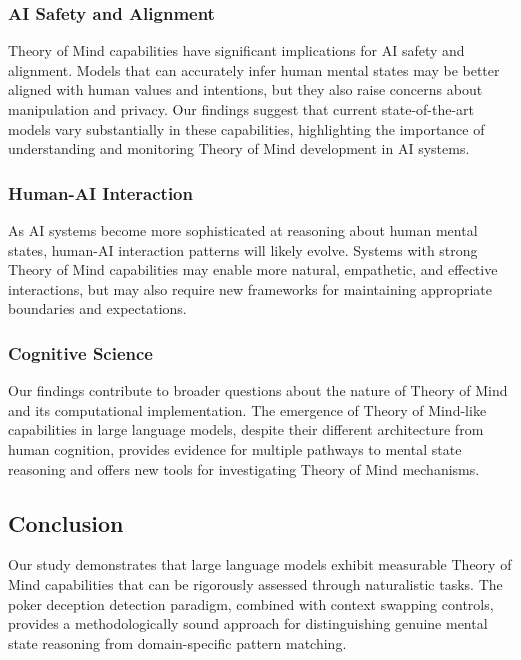 \subsubsection{AI Safety and Alignment}

Theory of Mind capabilities have significant implications for AI safety and alignment. Models that can accurately infer human mental states may be better aligned with human values and intentions, but they also raise concerns about manipulation and privacy. Our findings suggest that current state-of-the-art models vary substantially in these capabilities, highlighting the importance of understanding and monitoring Theory of Mind development in AI systems.

\subsubsection{Human-AI Interaction}

As AI systems become more sophisticated at reasoning about human mental states, human-AI interaction patterns will likely evolve. Systems with strong Theory of Mind capabilities may enable more natural, empathetic, and effective interactions, but may also require new frameworks for maintaining appropriate boundaries and expectations.

\subsubsection{Cognitive Science}

Our findings contribute to broader questions about the nature of Theory of Mind and its computational implementation. The emergence of Theory of Mind-like capabilities in large language models, despite their different architecture from human cognition, provides evidence for multiple pathways to mental state reasoning and offers new tools for investigating Theory of Mind mechanisms.

\subsection{Conclusion}
\label{subsec:conclusion}

Our study demonstrates that large language models exhibit measurable Theory of Mind capabilities that can be rigorously assessed through naturalistic tasks. The poker deception detection paradigm, combined with context swapping controls, provides a methodologically sound approach for distinguishing genuine mental state reasoning from domain-specific pattern matching.

